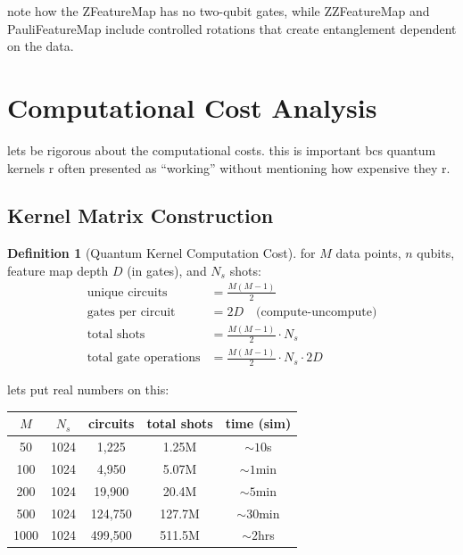 \documentclass[11pt,a4paper]{article}
\theoremstyle{definition}
\newtheorem{definition}{Definition}[section]
\theoremstyle{remark}
\begin{document}
note how the ZFeatureMap has no two-qubit gates, while ZZFeatureMap and PauliFeatureMap include controlled rotations that create entanglement dependent on the data.

\section{Computational Cost Analysis}

lets be rigorous about the computational costs. this is important bcs quantum kernels r often presented as ``working'' without mentioning how expensive they r.

\subsection{Kernel Matrix Construction}

\begin{definition}[Quantum Kernel Computation Cost]
for $M$ data points, $n$ qubits, feature map depth $D$ (in gates), and $N_s$ shots:
\begin{align}
\text{unique circuits} &= \frac{M(M-1)}{2} \\
\text{gates per circuit} &= 2D \quad \text{(compute-uncompute)} \\
\text{total shots} &= \frac{M(M-1)}{2} \cdot N_s \\
\text{total gate operations} &= \frac{M(M-1)}{2} \cdot N_s \cdot 2D
\end{align}
\end{definition}

lets put real numbers on this:

\begin{center}
\renewcommand{\arraystretch}{1.3}
\begin{tabular}{|c|c|c|c|c|}
\hline
$M$ & $N_s$ & circuits & total shots & time (sim) \\
\hline
50 & 1024 & 1,225 & 1.25M & $\sim 10$s \\
\hline
100 & 1024 & 4,950 & 5.07M & $\sim 1$min \\
\hline
200 & 1024 & 19,900 & 20.4M & $\sim 5$min \\
\hline
500 & 1024 & 124,750 & 127.7M & $\sim 30$min \\
\hline
1000 & 1024 & 499,500 & 511.5M & $\sim 2$hrs \\
\hline
\end{tabular}
\end{center}
\end{document}

